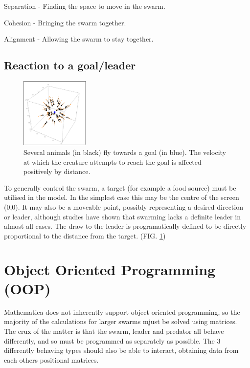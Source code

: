 \documentclass[
reprint,
showpacs,preprintnumbers,
amsmath,amssymb,
prl,
]{revtex4-1}
\begin{document}
\begin{description}
		\item{Separation - Finding the space to move in the swarm.}
		\item{Cohesion - Bringing the swarm together.}
		\item{Alignment - Allowing the swarm to stay together.}
\end{description}

\subsection{\label{sec:level2}Reaction to a goal/leader}

\begin{figure}[!htp]
	\includegraphics[width=0.3\textwidth]{images/leader.png}

	\caption{
		Several animals (in black) fly towards a goal (in blue).
		The velocity at which the creature attempts to reach the goal is affected positively by distance.
	}

	\label{fig:boidleader}
\end{figure}

To generally control the swarm, a target (for example a food source) must be utilised in the model.
In the simplest case this may be the centre of the screen (0,0).
It may also be a moveable point, possibly representing a desired direction or leader, although studies have shown that swarming lacks a definite leader in almost all cases.\cite{modellingflocks}
The draw to the leader is programatically defined to be directly proportional to the distance from the target. (FIG. \ref{fig:boidleader})

\section{\label{sec:level1}Object Oriented Programming (OOP)}

Mathematica does not inherently support object oriented programming, so the majority of the calculations for larger swarms mjust be solved using matrices.
The crux of the matter is that the swarm, leader and predator all behave differently, and so must be programmed as separately as possible.
The 3 differently behaving types should also be able to interact, obtaining data from each others positional matrices.
\end{document}
